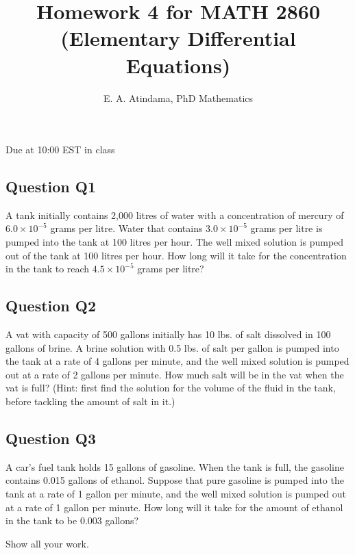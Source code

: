 \documentclass[a4paper,11pt,reqno]{amsart}
\title[MATH 2860 (Elementary Differential Equations)]{Homework 4 for MATH 2860 (Elementary Differential Equations)}
\author[Emmanuel Atindama]{E. A. Atindama, PhD Mathematics}
\numberwithin{equation}{section}
\begin{document}
\maketitle

Due at 10:00 EST in class

\subsection*{Question Q1}
  A tank initially contains 2,000 litres of water with a concentration of mercury of $6.0\times10^{-5}$ grams
  per litre. Water that contains $3.0\times 10^{-5}$ grams per litre is pumped into the tank at 100 litres per
  hour. The well mixed solution is pumped out of the tank at 100 litres per hour. How long will it
  take for the concentration in the tank to reach $4.5\times 10^{-5}$ grams per litre?

  \vspace{1cm}



\subsection*{Question Q2}
  A vat with capacity of 500 gallons initially has 10 lbs. of salt dissolved in 100 gallons of brine. A
  brine solution with 0.5 lbs. of salt per gallon is pumped into the tank at a rate of 4 gallons per
  minute, and the well mixed solution is pumped out at a rate of 2 gallons per minute. How much
  salt will be in the vat when the vat is full? (Hint: first find the solution for the volume of the fluid in the tank, before tackling the amount of salt in it.)
  
  \vspace{1cm}


  
\subsection*{Question Q3}
  A car's fuel tank holds 15 gallons of gasoline. When the tank is full, the gasoline contains 0.015 gallons of ethanol. 
  Suppose that pure gasoline is pumped into the tank at a rate of 1 gallon per minute, and the well mixed solution is 
  pumped out at a rate of 1 gallon per minute. How long will it take for the amount of ethanol in the tank to be 0.003 gallons?

  \textcolor{red!20}{Show all your work.}
\end{document}
